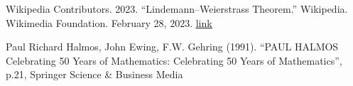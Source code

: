\documentclass[12pt]{article}
\begin{document}
\begin{flushleft}
    Wikipedia Contributors. 2023. “Lindemann–Weierstrass Theorem.” Wikipedia. Wikimedia Foundation. February 28, 2023. \href{https://en.wikipedia.org/wiki/Lindemann%E2%80%93Weierstrass_theorem}{\underline{link}}
\end{flushleft}

\begin{flushleft}
    Paul Richard Halmos, John Ewing, F.W. Gehring (1991). “PAUL HALMOS Celebrating 50 Years of Mathematics: Celebrating 50 Years of Mathematics”, p.21, Springer Science \& Business Media
\end{flushleft}
\end{document}
